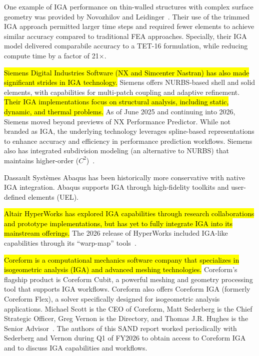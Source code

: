 \documentclass[12pt,report,justified]{SANDreport}
\begin{document}
One example of IGA performance on thin-walled structures with complex surface geometry was provided by Novozhilov and Leidinger~\cite{Novozhilov2025}.  Their use of the trimmed IGA approach permitted larger time steps and required fewer elements to achieve similar accuracy compared to traditional FEA approaches.  Specially, their IGA model delivered comparabile accuracy to a TET-16 formulation, while reducing compute time by a factor of 21$\times$.

\hl{Siemens Digital Industries Software (NX and Simcenter Nastran) has also made significant strides in IGA technology.}  Siemens offers NURBS-based shell and solid elements, with capabilities for multi-patch coupling and adaptive refinement.  \hl{Their IGA implementations focus on structural analysis, including static, dynamic, and thermal problems.}  As of June 2025 and continuing into 2026, Siemens moved beyond previews of NX Performance Predictor.  While not branded as IGA, the underlying technology leverages spline-based representations to enhance accuracy and efficiency in performance prediction workflows.  Siemens also has integrated subdivision modeling (an alternative to NURBS) that maintains higher-order ($C^2$)~\cite{SiemensNX2025}.

Dassault Syst\`{e}mes Abaqus has been historically more conservative with native IGA integration.  Abaqus supports IGA through high-fidelity toolkits and user-defined elements (UEL).

\hl{Altair HyperWorks has explored IGA capabilities through research collaborations and prototype implementations, but has yet to fully integrate IGA into its mainstream offerings.}  The 2026 release of HyperWorks included IGA-like capabilities through its ``warp-map'' tools~\cite{Altair2026}.

\hl{Coreform is a computational mechanics software company that specializes in isogeometric analysis (IGA) and advanced meshing technologies.}  Coreform's flagship product is Coreform Cubit, a powerful meshing and geometry processing tool that supports IGA workflows.  Coreform also offers Coreform IGA (formerly Coreform Flex), a solver specifically designed for isogeometric analysis applications.  Michael Scott is the CEO of Coreform, Matt Sederberg is the Chief Strategic Officer, Greg Vernon is the Directory, and Thomas J.R. Hughes is the Senior Advisor~\cite{CoreforeAbout2026}.  The authors of this SAND report worked periodically with Sederberg and Vernon during Q1 of FY2026 to obtain access to Coreform IGA and to discuss IGA capabilities and workflows.
\end{document}
